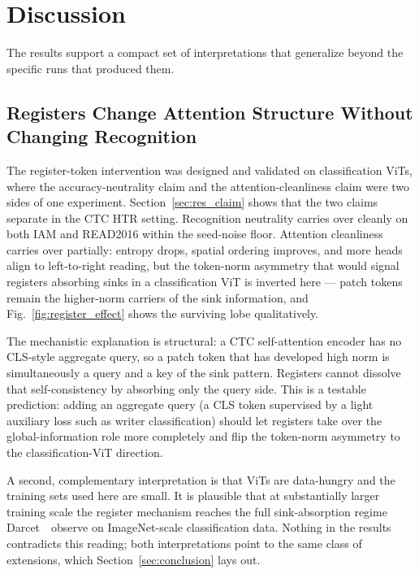 \section{Discussion}
\label{sec:discussion}

The results support a compact set of interpretations that generalize beyond the specific runs that produced them.

\subsection{Registers Change Attention Structure Without Changing Recognition}
\label{sec:disc_registers}

The register-token intervention was designed and validated on classification ViTs, where the accuracy-neutrality claim and the attention-cleanliness claim were two sides of one experiment. Section~\ref{sec:res_claim} shows that the two claims separate in the CTC HTR setting. Recognition neutrality carries over cleanly on both IAM and READ2016 within the seed-noise floor. Attention cleanliness carries over partially: entropy drops, spatial ordering improves, and more heads align to left-to-right reading, but the token-norm asymmetry that would signal registers absorbing sinks in a classification ViT is inverted here --- patch tokens remain the higher-norm carriers of the sink information, and Fig.~\ref{fig:register_effect} shows the surviving lobe qualitatively.

The mechanistic explanation is structural: a CTC self-attention encoder has no CLS-style aggregate query, so a patch token that has developed high norm is simultaneously a query and a key of the sink pattern. Registers cannot dissolve that self-consistency by absorbing only the query side. This is a testable prediction: adding an aggregate query (a CLS token supervised by a light auxiliary loss such as writer classification) should let registers take over the global-information role more completely and flip the token-norm asymmetry to the classification-ViT direction.

A second, complementary interpretation is that ViTs are data-hungry and the training sets used here are small. It is plausible that at substantially larger training scale the register mechanism reaches the full sink-absorption regime Darcet~\etal\ observe on ImageNet-scale classification data. Nothing in the results contradicts this reading; both interpretations point to the same class of extensions, which Section~\ref{sec:conclusion} lays out.

